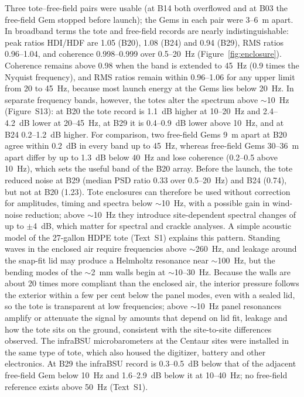 \documentclass[]{seismica}
\newcommand{\suppfig}[1]{Figure~S#1}
\begin{document}
Three tote--free-field pairs were usable (at B14 both overflowed and at
B03 the free-field Gem stopped before launch); the Gems in each pair were
3--6~m apart. In broadband terms the tote and free-field records are
nearly indistinguishable: peak ratios HDI/HDF are 1.05 (B20), 1.08 (B24)
and 0.94 (B29), RMS ratios 0.96--1.04, and coherence 0.998--0.999 over
0.5--20~Hz (Figure~\ref{fig:enclosure}). Coherence remains above 0.98
when the band is extended to 45~Hz (0.9 times the Nyquist frequency),
and RMS ratios remain within 0.96--1.06 for any upper limit from 20 to
45~Hz, because most launch energy at the Gems lies below 20~Hz. In
separate frequency bands, however, the totes alter the spectrum above
$\sim$10~Hz (\suppfig{13}): at B20 the tote record is 1.1~dB higher
at 10--20~Hz and 2.4--4.2~dB lower at 20--45~Hz, at B29 it is
0.4--0.9~dB lower above 10~Hz, and at B24 0.2--1.2~dB higher. For
comparison, two free-field Gems 9~m apart at B20 agree within 0.2~dB in
every band up to 45~Hz, whereas free-field Gems 30--36~m apart differ by
up to 1.3~dB below 40~Hz and lose coherence (0.2--0.5 above 10~Hz),
which sets the useful band of the B20 array. Before the launch, the tote
reduced noise at B29 (median PSD ratio 0.33 over 0.5--20~Hz) and B24
(0.74), but not at B20 (1.23). Tote enclosures can therefore be used
without correction for amplitudes, timing and spectra below $\sim$10~Hz,
with a possible gain in wind-noise reduction; above $\sim$10~Hz they
introduce site-dependent spectral changes of up to $\pm$4~dB, which
matter for spectral and crackle analyses.
A simple acoustic model of the 27-gallon HDPE tote (Text~S1) explains
this pattern. Standing waves in the enclosed air require frequencies
above $\sim$260~Hz, and leakage around the snap-fit lid may produce a
Helmholtz resonance near $\sim$100~Hz, but the bending modes of the
$\sim$2~mm walls begin at $\sim$10--30~Hz. Because the walls are about 20
times more compliant than the enclosed air, the interior pressure follows
the exterior within a few per cent below the panel modes, even with a
sealed lid, so the tote is transparent at low frequencies; above
$\sim$10~Hz panel resonances amplify or attenuate the signal by amounts
that depend on lid fit, leakage and how the tote sits on the ground,
consistent with the site-to-site differences observed.
The infraBSU microbarometers at the Centaur sites were installed in the
same type of tote, which also housed the digitizer, battery and other
electronics. At B29 the infraBSU record is 0.3--0.5~dB below that of the
adjacent free-field Gem below 10~Hz and 1.6--2.9~dB below it at
10--40~Hz; no free-field reference exists above 50~Hz (Text~S1).
\end{document}
